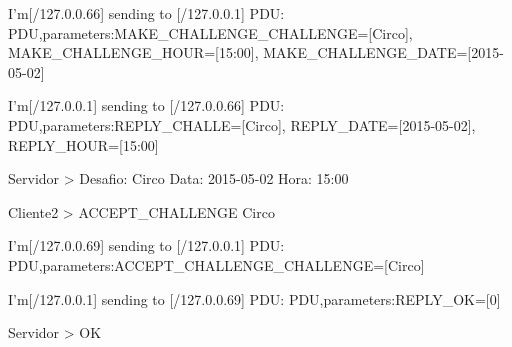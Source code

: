\documentclass[runningheads,a4paper]{llncs}
\begin{document}
I'm[/127.0.0.66] sending to [/127.0.0.1] PDU: PDU,parameters:{MAKE_CHALLENGE_CHALLENGE=[Circo], MAKE_CHALLENGE_HOUR=[15:00], MAKE_CHALLENGE_DATE=[2015-05-02]}

I'm[/127.0.0.1] sending to [/127.0.0.66] PDU: PDU,parameters:{REPLY_CHALLE=[Circo], REPLY_DATE=[2015-05-02], REPLY_HOUR=[15:00]}

Servidor >  Desafio: Circo Data: 2015-05-02 Hora: 15:00

Cliente2 > ACCEPT_CHALLENGE Circo

I'm[/127.0.0.69] sending to [/127.0.0.1] PDU: PDU,parameters:{ACCEPT_CHALLENGE_CHALLENGE=[Circo]}

I'm[/127.0.0.1] sending to [/127.0.0.69] PDU: PDU,parameters:{REPLY_OK=[0]}

Servidor > OK
\end{document}
